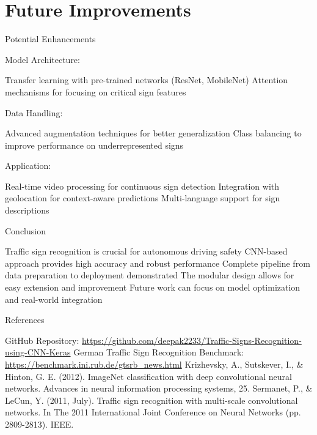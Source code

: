 \documentclass{beamer}
\begin{document}
\section{Future Improvements}

\begin{frame}{Potential Enhancements}
\begin{itemize}
    {Model Architecture}:
    \begin{itemize}
        Transfer learning with pre-trained networks (ResNet, MobileNet)
        Attention mechanisms for focusing on critical sign features
    \end{itemize}
    {Data Handling}:
    \begin{itemize}
        Advanced augmentation techniques for better generalization
        Class balancing to improve performance on underrepresented signs
    \end{itemize}
    {Application}:
    \begin{itemize}
        Real-time video processing for continuous sign detection
        Integration with geolocation for context-aware predictions
        Multi-language support for sign descriptions
    \end{itemize}
\end{itemize}
\end{frame}

\begin{frame}{Conclusion}
\begin{itemize}
    Traffic sign recognition is crucial for autonomous driving safety
    CNN-based approach provides high accuracy and robust performance
    Complete pipeline from data preparation to deployment demonstrated
    The modular design allows for easy extension and improvement
    Future work can focus on model optimization and real-world integration
\end{itemize}
\end{frame}

\begin{frame}{References}
\begin{itemize}
    GitHub Repository: 
    \url{https://github.com/deepak2233/Traffic-Signs-Recognition-using-CNN-Keras}
    German Traffic Sign Recognition Benchmark:
    \url{https://benchmark.ini.rub.de/gtsrb_news.html}
    Krizhevsky, A., Sutskever, I., \& Hinton, G. E. (2012). ImageNet classification with deep convolutional neural networks. Advances in neural information processing systems, 25.
    Sermanet, P., \& LeCun, Y. (2011, July). Traffic sign recognition with multi-scale convolutional networks. In The 2011 International Joint Conference on Neural Networks (pp. 2809-2813). IEEE.
\end{itemize}
\end{frame}
\end{document}
